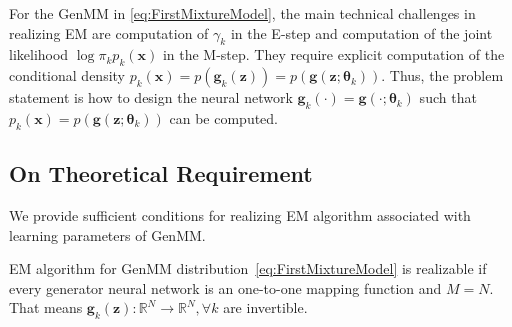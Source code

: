 For the GenMM in \eqref{eq:FirstMixtureModel}, the main technical challenges in realizing EM are computation of $\gamma_k$ in the E-step and computation of the joint likelihood $\log{\pi_k p_k(\bm{x})}$ in the M-step. They require explicit computation of the conditional density $p_k(\bm{x}) =  p(\bm{g}_k(\bm{z})) =p(\bm{g}(\bm{z};\bm{\theta}_k))$. Thus, the problem statement is how to design the neural network $\bm{g}_k(\cdot) = \bm{g}(\cdot;\bm{\theta}_k)$ such that $p_k(\bm{x})=p(\bm{g}(\bm{z};\bm{\theta}_k))$ can be computed.





\subsection{On Theoretical Requirement}

We provide sufficient conditions for realizing EM algorithm associated with learning parameters of GenMM.  

\begin{proposition}
  EM algorithm for GenMM distribution~\eqref{eq:FirstMixtureModel} is realizable if every generator neural network is an one-to-one mapping function and $M=N$. That means $\bm{g}_k(\bm{z}): \mathbb{R}^N \rightarrow \mathbb{R}^N, \forall k$ are invertible.
\end{proposition}


